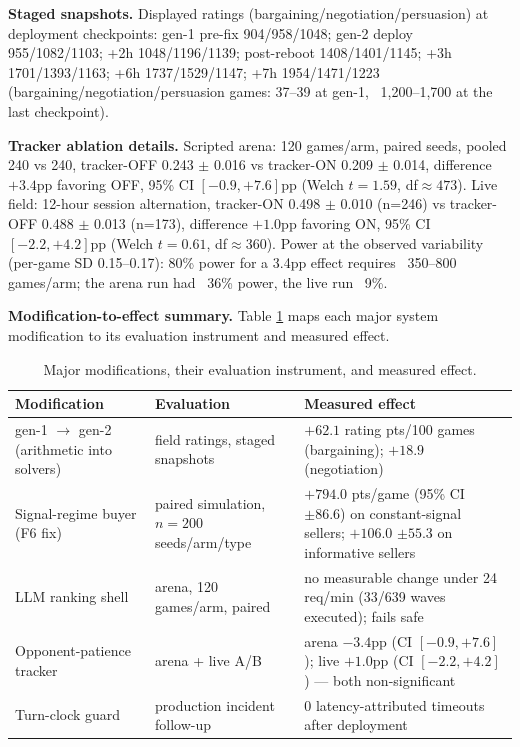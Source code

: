 \documentclass{article}
\begin{document}
\textbf{Staged snapshots.} Displayed ratings (bargaining/negotiation/persuasion) at deployment checkpoints: gen-1 pre-fix 904/958/1048; gen-2 deploy 955/1082/1103; +2h 1048/1196/1139; post-reboot 1408/1401/1145; +3h 1701/1393/1163; +6h 1737/1529/1147; +7h 1954/1471/1223 (bargaining/negotiation/persuasion games: 37--39 at gen-1, ~1,200--1,700 at the last checkpoint).

\textbf{Tracker ablation details.} Scripted arena: 120 games/arm, paired seeds, pooled 240 vs 240, tracker-OFF 0.243 $\pm$ 0.016 vs tracker-ON 0.209 $\pm$ 0.014, difference $+3.4$pp favoring OFF, 95\% CI $[-0.9, +7.6]$pp (Welch $t=1.59$, df$\approx473$). Live field: 12-hour session alternation, tracker-ON 0.498 $\pm$ 0.010 (n=246) vs tracker-OFF 0.488 $\pm$ 0.013 (n=173), difference $+1.0$pp favoring ON, 95\% CI $[-2.2, +4.2]$pp (Welch $t=0.61$, df$\approx360$). Power at the observed variability (per-game SD 0.15--0.17): 80\% power for a 3.4pp effect requires ~350--800 games/arm; the arena run had ~36\% power, the live run ~9\%.

\textbf{Modification-to-effect summary.} Table \ref{tab:mods} maps each major system modification to its evaluation instrument and measured effect.

\begin{table}[h]\centering\small
\caption{Major modifications, their evaluation instrument, and measured effect.}
\label{tab:mods}
\begin{tabular}{p{3.4cm}p{3.6cm}p{5.4cm}}
\toprule
Modification & Evaluation & Measured effect \\
\midrule
gen-1 $\to$ gen-2 (arithmetic into solvers) & field ratings, staged snapshots & $+62.1$ rating pts/100 games (bargaining); $+18.9$ (negotiation) \\
Signal-regime buyer (F6 fix) & paired simulation, $n=200$ seeds/arm/type & $+794.0$ pts/game (95\% CI $\pm 86.6$) on constant-signal sellers; $+106.0$ $\pm 55.3$ on informative sellers \\
LLM ranking shell & arena, 120 games/arm, paired & no measurable change under 24 req/min (33/639 waves executed); fails safe \\
Opponent-patience tracker & arena + live A/B & arena $-3.4$pp (CI $[-0.9,+7.6]$); live $+1.0$pp (CI $[-2.2,+4.2]$) --- both non-significant \\
Turn-clock guard & production incident follow-up & 0 latency-attributed timeouts after deployment \\
\bottomrule
\end{tabular}
\end{table}
\end{document}
